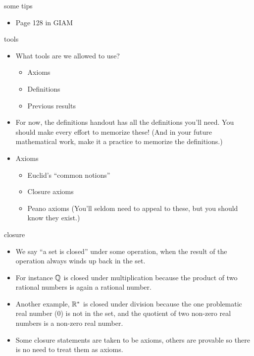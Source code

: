 \documentclass[landscape]{beamer}
\begin{document}
\begin{frame}{some tips}
\begin{itemize}
\item Page 128 in GIAM
\end{itemize}
\end{frame}

\begin{frame}{tools}
\begin{itemize}
\item What tools are we allowed to use? \pause
\begin{itemize}
\item Axioms \pause
\item Definitions \pause
\item Previous results \pause
\end{itemize}
\item For now, the definitions handout has all the definitions you'll need. \pause \newline
You should make every effort to memorize these! \pause \newline
(And in your future mathematical work, make it a practice to memorize the definitions.) \pause
\item Axioms \pause
\begin{itemize}
\item Euclid's ``common notions'' \pause
\item Closure axioms \pause
\item Peano axioms \pause \newline
(You'll seldom need to appeal to these, but you should know they exist.)
\end{itemize}
\end{itemize}
\end{frame}

\begin{frame}{closure}
\begin{itemize}
\item We say ``a set is closed'' under some operation, when the result of the operation always winds up back in the set. \pause
\item For instance ${\mathbb Q}$ is closed under multiplication because the product of two rational numbers is again a rational number. \pause
\item Another example, ${\mathbb R}^\ast$ is closed under division because the one problematic real number ($0$) is not in the set, and the quotient of two non-zero real numbers is a non-zero real number. \pause
\item Some closure statements are taken to be axioms, others are provable so there is no need to treat them as axioms. 
\end{itemize}
\end{frame}
\end{document}
